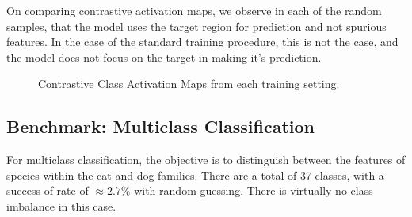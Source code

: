\documentclass{article}
\theoremstyle{plain}
\theoremstyle{definition}
\theoremstyle{remark}
\begin{document}
On comparing contrastive activation maps, we observe in each of the random samples, that the model uses the target region for prediction and not spurious features. In the case of the standard training procedure, this is not the case, and the model does not focus on the target in making it's prediction.

\begin{figure}[H]
	\centering
	\hspace{1em}
	\hspace{1em}
	\caption{Contrastive Class Activation Maps from each training setting.}
\end{figure}


\subsection{Benchmark: Multiclass Classification}

For multiclass classification, the objective is to distinguish between the features of species within the cat and dog families. There are a total of 37 classes, with a success of rate of $\approx 2.7\%$ with random guessing. There is virtually no class imbalance in this case.
\end{document}
